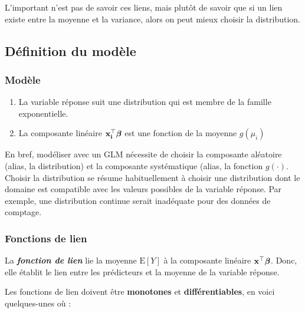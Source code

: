 \documentclass[french]{article}
\begin{document}
\begin{multicols*}{2}
L'important n'est pas de savoir ces liens, mais plutôt de savoir que si un lien existe entre la moyenne et la variance, alors on peut mieux choisir la distribution.



\columnbreak
\subsection{Définition du modèle}
\subsubsection{Modèle}
\begin{definitionNOHFILLprop}
\begin{enumerate}
	\item	La variable réponse suit une distribution qui est membre de la famille exponentielle.
	\item	La composante linéaire $\mathbf{x_{i}^{\top}}\bm{\beta}$ est une fonction de la moyenne $g(\mu_{i})$
\end{enumerate}

En bref, modéliser avec un GLM nécessite de choisir la composante aléatoire (alias, la distribution) et la composante systématique (alias, la fonction $g(\cdot)$. Choisir la distribution se résume habituellement à choisir une distribution dont le domaine est compatible avec les valeurs possibles de la variable réponse. Par exemple, une distribution continue serait inadéquate pour des données de comptage.
\end{definitionNOHFILLprop}



\subsubsection{Fonctions de lien}
\begin{rappel_enhanced}[Contexte]
La \textbf{\textit{fonction de lien}} lie la moyenne $\text{E}[Y]$ à la composante linéaire $\mathbf{x^{\top}}\bm{\beta}$. Donc, elle établit le lien entre les prédicteurs et la moyenne de la variable réponse.
\end{rappel_enhanced}

Les fonctions de lien doivent être \textbf{monotones} et \textbf{différentiables}, en voici quelques-unes où   : 


\end{multicols*}
\end{document}
